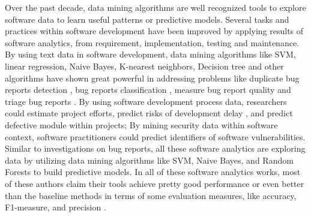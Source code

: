  Over the past decade, data mining algorithms are well
 recognized tools to explore software data to learn useful patterns or predictive
 models. Several tasks and practices within software development have been
 improved by applying results of software analytics, from requirement, implementation, testing and maintenance.
By using text data in software development, data mining algorithms like SVM, linear regression, Naive Bayes, K-nearest neighbors, Decision tree and other algorithms have shown great powerful in addressing problems like
duplicate bug reports detection \cite{sun2010discriminative,jalbert2008automated,alipour2013contextual,nguyen2012duplicate}, bug reports classification \cite{antoniol2008bug,zanetti2013categorizing,lamkanfi2011comparing,tian2013drone}, measure bug report quality \cite{bettenburg2008makes} and triage bug reports \cite{anvik2006should, bhattacharya2010fine, lin2009empirical}. By using software development process data,
researchers could estimate project
efforts\cite{dejaeger2012data,kocaguneli2012value, menzies2013local}, predict risks of 
development delay \cite{da2014empirical,choetkiertikul2015predicting}, and predict defective
module within projects\cite{me07b,hall11,lessmann2008benchmarking}; By mining security
data within software context, software practitioners could predict identifiers of software vulnerabilities\cite{shin2011evaluating,scandariato2012predicting,medeiros2014automatic}.
Similar to investigations on bug reports, all these software analytics 
are exploring data by utilizing data mining algorithms like SVM, Naive Bayes, and
Random Forests\cite{lessmann2008benchmarking, me07b, choetkiertikul2015predicting} to build 
predictive models. In all of these software analytics works,  most of these authors claim
their tools achieve pretty good performance or even better than the baseline methods in terms
of some evaluation measures, like accuracy, F1-measure, and precision \cite{lamkanfi2011comparing, alipour2013contextual,lin2009empirical,lessmann2008benchmarking,hall11}.

